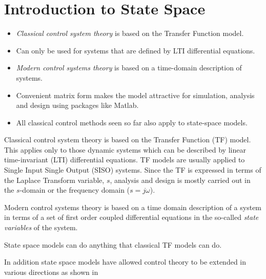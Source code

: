 \def\FileDate{9/9/29}
\def\FileVersion{1.1}
\section*{Introduction to State Space}

\begin{slide}\label{slides:l13s1}
\begin{itemize}
	\item \emph{Classical control system theory} is based on the Transfer Function model.
	\item Can only be used for systems that are defined by LTI differential equations. 
	\item \emph{Modern control systems theory} is based on a time-domain description of systems.
	\item Convenient matrix form makes the model attractive for simulation, analysis and design using packages like Matlab.
	\item All classical control methods seen so far also apply to state-space models.
\end{itemize}
\end{slide}

Classical control system theory is based on the Transfer Function (TF) model. This applies only to those dynamic systems which can be described by linear time-invariant (LTI) differential equations. TF models are usually applied to Single Input Single Output (SISO) systems. Since the TF is expressed in terms of the Laplace Transform variable, $s$, analysis and design is mostly carried out in the $s$-domain or the frequency domain ($s=j\omega$).

Modern control systems theory is based on a time domain description of a system in terms of a set of first order coupled differential equations in the so-called \emph{state variables} of the system.

State space models can do anything that classical TF models can do.

In addition state space models have allowed control theory to be extended in various directions as shown in 

